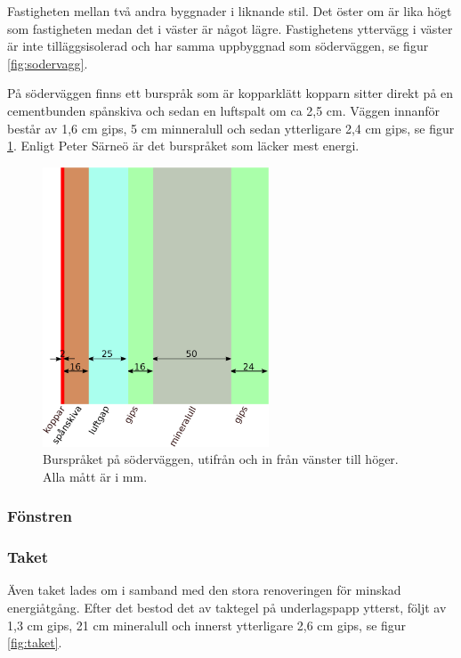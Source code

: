 Fastigheten mellan två andra byggnader i liknande stil. Det öster om är lika högt som fastigheten medan det i väster är något lägre. Fastighetens yttervägg i väster är inte tilläggsisolerad och har samma uppbyggnad som söderväggen, se figur \ref{fig:sodervagg}.

På söderväggen finns ett burspråk som är kopparklätt kopparn sitter direkt på en cementbunden spånskiva och sedan en luftspalt om ca 2,5 cm. Väggen innanför består av 1,6 cm gips, 5 cm minneralull och sedan ytterligare 2,4 cm gips, se figur \ref{fig:bursprak}.\cite{kandidatarbete2010} Enligt Peter Särneö\cite{petersarneo} är det burspråket som läcker mest energi.

\begin{figure}[hpbt]
\centering
\includegraphics[width=0.6\textwidth]{images/bursprak.eps}
\caption{\label{fig:bursprak}{Burspråket på söderväggen, utifrån och in från vänster till höger. Alla mått är i mm.}}
\end{figure}

\subsubsection{Fönstren}


\subsubsection{Taket}
Även taket lades om i samband med den stora renoveringen för minskad energiåtgång. Efter det bestod det av taktegel på underlagspapp ytterst, följt av 1,3 cm gips, 21 cm mineralull och innerst ytterligare 2,6 cm gips, se figur \ref{fig:taket}.\cite{kandidatarbete2010}

